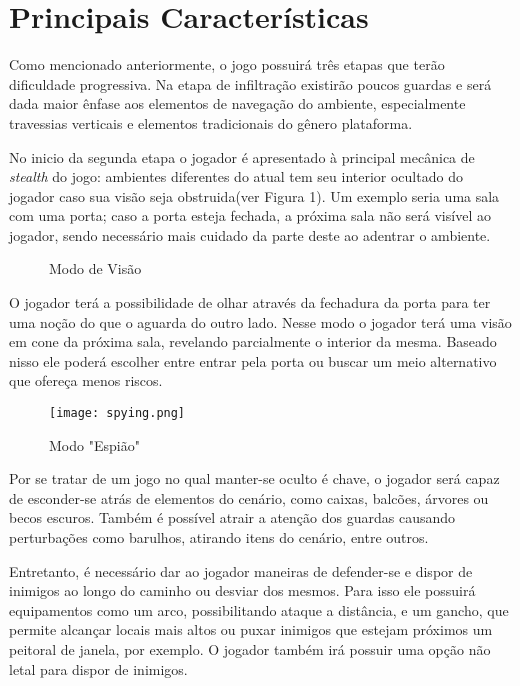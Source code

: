 \AddToShipoutPicture{\BackgroundPic}

\section*{Principais Características}

Como mencionado anteriormente, o jogo possuirá três etapas que terão dificuldade progressiva. Na etapa de infiltração existirão poucos guardas e será dada maior ênfase aos elementos de navegação do ambiente, especialmente travessias verticais e elementos tradicionais do gênero plataforma. 

	No inicio da segunda etapa o jogador é apresentado à principal mecânica de \emph{stealth} do jogo: ambientes diferentes do atual tem seu interior ocultado do jogador caso sua visão seja obstruida(ver Figura 1). Um exemplo seria uma sala com uma porta; caso a porta esteja fechada, a próxima sala não será visível ao jogador, sendo necessário mais cuidado da parte deste ao adentrar o ambiente. 
	
	\begin{figure}[h]
		\center
		\qquad
		\label{visionmode}
		\caption{Modo de Visão}
	\end{figure}
	
O jogador terá a possibilidade de olhar através da fechadura da porta para ter uma noção do que o aguarda do outro lado. Nesse modo o jogador terá uma visão em cone da próxima sala, revelando parcialmente o interior da mesma. Baseado nisso ele poderá escolher entre entrar pela porta ou buscar um meio alternativo que ofereça menos riscos.

	\begin{figure}[htb]
		\centering
		\texttt{[image: spying.png]}
		\caption{Modo "Espião"}
	\end{figure}

Por se tratar de um jogo no qual manter-se oculto é chave, o jogador será capaz de esconder-se atrás de elementos do cenário, como caixas, balcões, árvores ou becos escuros. Também é possível atrair a atenção dos guardas causando perturbações como barulhos, atirando itens do cenário, entre outros. 

	Entretanto, é necessário dar ao jogador maneiras de defender-se e dispor de inimigos ao longo do caminho ou desviar dos mesmos. Para isso ele possuirá equipamentos como um arco, possibilitando ataque a distância, e um gancho, que permite alcançar locais mais altos ou puxar inimigos que estejam próximos um peitoral de janela, por exemplo. O jogador também irá possuir uma opção não letal para dispor de inimigos. 

